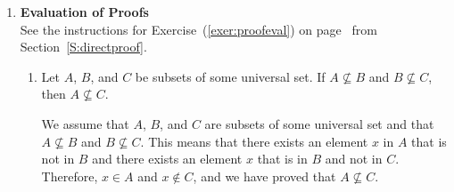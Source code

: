 \begin{enumerate}


%
%
%
%

\item \textbf{Evaluation of Proofs}  \hfill \\
See the instructions for Exercise~(\ref{exer:proofeval}) on 
page~\pageref{exer:proofeval} from Section~\ref{S:directproof}.

\begin{enumerate}
\item Let $A$, $B$, and $C$ be subsets of some universal set.  If $A \not \subseteq B$ and 
$B \not \subseteq C$, then $A \not \subseteq C$.

\begin{myproof}
We assume that $A$, $B$, and $C$ are subsets of some universal set and that 
$A \not \subseteq B$ and $B \not \subseteq C$.  This means that there exists an element $x$ in 
$A$ that is not in $B$ and there exists an element $x$ that is in $B$ and not in $C$.  Therefore, $x \in A$ and $x \notin C$, and we have proved that $A \not \subseteq C$.
\end{myproof}


\end{enumerate}
\end{enumerate}
